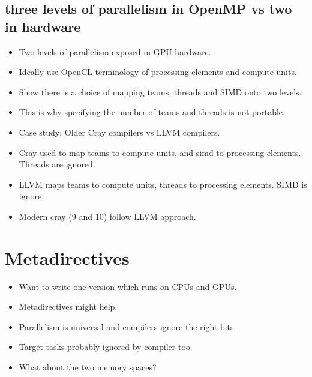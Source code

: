 \subsection{three levels of parallelism in OpenMP vs two in hardware}
\begin{itemize}
  \item Two levels of parallelism exposed in GPU hardware.
  \item Ideally use OpenCL terminology of processing elements and compute units.
  \item Show there is a choice of mapping teams, threads and SIMD onto two levels.
  \item This is why specifying the number of teams and threads is not portable.
  \item Case study: Older Cray compilers vs LLVM compilers.
  \item Cray used to map teams to compute units, and simd to processing elements. Threads are ignored.
  \item LLVM maps teams to compute units, threads to processing elements. SIMD is ignore.
  \item Modern cray (9 and 10) follow LLVM approach.
\end{itemize}

\section{Metadirectives}
\begin{itemize}
  \item Want to write one version which runs on CPUs and GPUs.
  \item Metadirectives might help.
  \item Parallelism is universal and compilers ignore the right bits.
  \item Target tasks probably ignored by compiler too.
  \item What about the two memory spaces?
\end{itemize}

